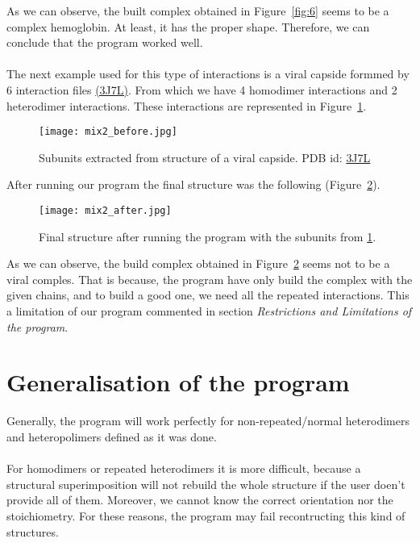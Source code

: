 \documentclass[a4paper,10pt]{report}
\begin{document}
\newpage

\noindent
As we can observe, the built complex obtained in Figure~\ref{fig:6} seems to be a complex hemoglobin. At least, it has the proper shape. Therefore, we can conclude that the program worked well.\\\\

\noindent
The next example used for this type of interactions is a viral capside formmed by 6 interaction files \href{https://www.rcsb.org/structure/3j7l}{(3J7L)}. From which we have 4 homodimer interactions and 2 heterodimer interactions. These interactions are represented in Figure~\ref{fig:7}.\\

\begin{figure}[h]
\texttt{[image: mix2\_before.jpg]}
\centering
\caption{Subunits extracted from structure of a viral capside. PDB id: \href{https://www.rcsb.org/structure/3j7l}{3J7L}}
\label{fig:7}
\end{figure}

\noindent
After running our program the final structure was the following (Figure~\ref{fig:8}).\\

\begin{figure}[h]
\centering
\texttt{[image: mix2\_after.jpg]}
\caption{Final structure after running the program with the subunits from \ref{fig:7}.}
\label{fig:8}
\end{figure}

\noindent
As we can observe, the build complex obtained in Figure~\ref{fig:8} seems not to be a viral comples. That is because, the program have only build the complex with the given chains, and to build a good one, we need all the repeated interactions. This a limitation of our program commented in section \textit{Restrictions and Limitations of the program}.\\


\section{Generalisation of the program}

Generally, the program will work perfectly for non-repeated/normal heterodimers and heteropolimers defined as it was done.\\\\
For homodimers or repeated heterodimers it is more difficult, because a structural superimposition will not rebuild the whole structure if the user doen't provide all of them. Moreover, we cannot know the correct orientation nor the stoichiometry. For these reasons, the program may fail recontructing this kind of structures.\\\\
\end{document}
